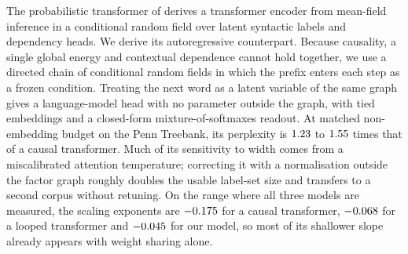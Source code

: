 The probabilistic transformer of \citet{wu2023probabilistic} derives a transformer encoder from
mean-field inference in a conditional random field over latent syntactic labels and dependency
heads. We derive its autoregressive counterpart. Because causality, a single global energy and
contextual dependence cannot hold together, we use a directed chain of conditional random fields
in which the prefix enters each step as a frozen condition. Treating the next word as a latent
variable of the same graph gives a language-model head with no parameter outside the graph, with
tied embeddings and a closed-form mixture-of-softmaxes readout. At matched non-embedding budget
on the Penn Treebank, its perplexity is $1.23$ to $1.55$ times that of a
causal transformer. Much of its sensitivity to width comes from a miscalibrated attention
temperature; correcting it with a normalisation outside the factor graph roughly doubles the
usable label-set size and transfers to a second corpus without retuning. On the range where all
three models are measured, the scaling exponents are $-0.175$ for a causal transformer,
$-0.068$ for a looped transformer and $-0.045$ for our model, so most of its shallower
slope already appears with weight sharing alone.
